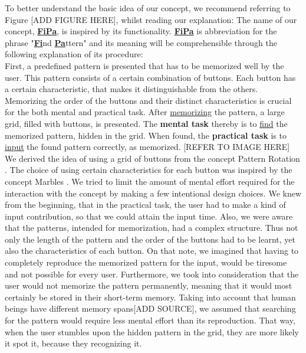 To better understand the basic idea of our concept, we recommend referring to Figure [ADD FIGURE HERE], whilst reading our explanation: 
The name of our concept, \underline{\textbf{FiPa}}, is inspired by its functionality. \underline{\textbf{FiPa}} is abbreviation for the phrase "\underline{\textbf{Fi}}nd \underline{\textbf{Pa}}ttern" and its meaning will be comprehensible through the following explanation of its procedure: \\
First, a predefined pattern is presented that has to be memorized well by the user. This pattern consists of a certain combination of buttons. Each button has a certain characteristic, that makes it distinguishable from the others. Memorizing the order of the buttons and their distinct characteristics is crucial for the both mental and practical task. After \underline{memorizing} the pattern, a large grid, filled with buttons, is presented. The \textbf{mental task} thereby is to \underline{find} the memorized pattern, hidden in the grid. When found, the \textbf{practical task} is to \underline{input} the found pattern correctly, as memorized. [REFER TO IMAGE HERE]\\

We derived the idea of using a grid of buttons from the concept Pattern Rotation \cite{patternRotation, anonymous}. The choice of using certain characteristics for each button was inspired by the concept Marbles \cite{patternRotation, anonymous}. We  tried to limit the amount of mental effort required for the interaction with the concept by making a few intentional design choices. We knew from the beginning, that in the practical task, the user had to make a kind of input contribution, so that we could attain the input time. Also, we were aware that the patterns, intended for memorization, had a complex structure. Thus not only the length of the pattern and the order of the buttons had to be learnt, yet also the characteristics of each button. On that note, we imagined that having to completely reproduce the memorized pattern for the input, would be tiresome and not possible for every user. Furthermore, we took into consideration that the user would not memorize the pattern permanently, meaning that it would most certainly be stored in their short-term memory. Taking into account that human beings have different memory spans[ADD SOURCE], we assumed that searching for the pattern would require less mental effort than its reproduction. That way, when the user stumbles upon the hidden pattern in the grid, they are more likely it spot it, because they recognizing it. 

